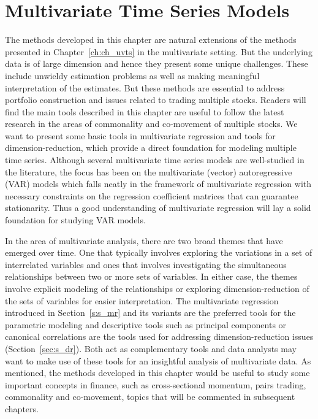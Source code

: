 \chapter{Multivariate Time Series Models\label{ch:ch_mvts}} \label{in:multimod1}

The methods developed in this chapter are natural extensions of the methods presented in Chapter~\ref{ch:ch_uvts} in the multivariate setting. But the underlying data is of large dimension and hence they present some unique challenges. These include unwieldy estimation problems as well as making meaningful interpretation of the estimates. But these methods are essential to address portfolio construction and issues related to trading multiple stocks. Readers will find the main tools described in this chapter are useful to follow the latest research in the areas of commonality and co-movement of multiple stocks. We want to present some basic tools in multivariate regression and tools for dimension-reduction, which provide a direct foundation for modeling multiple time series. Although several multivariate time series models are well-studied in the literature, the focus has been on the multivariate (vector) autoregressive (VAR) models which falls neatly in the framework of multivariate regression with necessary constraints on the regression coefficient matrices that can guarantee stationarity. Thus a good understanding of multivariate regression will lay a solid foundation for studying VAR models.


In the area of multivariate analysis, there are two broad themes that have emerged over time. One that typically involves exploring the variations in a set of interrelated variables and ones that involves investigating the simultaneous relationships between two or more sets of variables. In either case, the themes involve explicit modeling of the relationships or exploring dimension-reduction of the sets of variables for easier interpretation. The multivariate regression introduced in Section~\ref{s:s_mr} and its variants are the preferred tools for the parametric modeling and descriptive tools such as principal components or canonical correlations are the tools used for addressing dimension-reduction issues (Section~\ref{sec:s_dr}). Both act as complementary tools and data analysts may want to make use of these tools for an insightful analysis of multivariate data. As mentioned, the methods developed in this chapter would be useful to study some important concepts in finance, such as cross-sectional momentum, pairs trading, commonality and co-movement, topics that will be commented in subsequent chapters.



